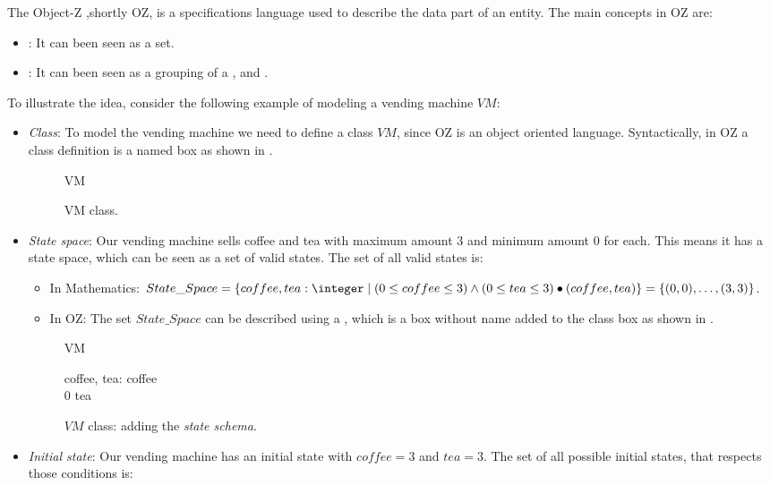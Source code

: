 The Object-Z ,shortly OZ, is a specifications language used to describe the data part of an entity. 
The main concepts in OZ are:
\begin{itemize}
\item {}: It can been seen as a set.
\item {}: It can been seen as a grouping of a  ,  and .
\end{itemize}

To illustrate the idea, consider the following example of modeling a vending machine $VM$:
\begin{itemize}
\item \textit{Class}: To model the vending machine we need to define a class $VM$, since OZ is an object oriented language. Syntactically, in OZ
a class definition is a named box as shown in .
\begin{figure}[H]
\centering
\begin{class}{VM}
\end{class}
\caption{VM class.}
\label{oz_VM_class}
\end{figure}
\item \textit{State space}: Our vending machine sells coffee and tea with maximum amount 3 and minimum amount 0 for each. This means it has a state space, which can be seen as a set of valid states. The set of all valid states is:
\begin{itemize}
\item In Mathematics: $State\_Space=\{coffee,tea: \integer\mid (0 \leq  coffee \leq 3) \wedge
(0 \leq  tea \leq 3)\bullet(coffee,tea)\}  =\{\pair{0}{0},\dots,\pair{3}{3}\}$.
\item In OZ: The set $State\_Space$ can be described using a , which is a box without name added to the class box as shown in .
\end{itemize}
\begin{figure}[H]
\centering
\begin{class}{VM}
\begin{state}
coffee, tea: \integer
{} \leq  coffee 
\\
0 \leq  tea 
\end{state} 
\end{class}
\caption{$VM$ class: adding the \textit{state schema}.}
\label{oz_VM_state}
\end{figure}
\item \textit{Initial state}: Our vending machine has an initial state with $coffee = 3$ and $tea = 3$. The set of all possible initial states, that respects those conditions is:  

\end{itemize}
